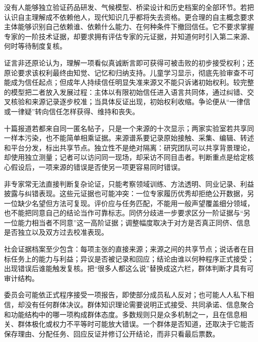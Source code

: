 没有人能够独立验证药品研发、气候模型、桥梁设计和历史档案的全部环节。若把认识自主理解成不依赖他人，现代知识几乎都将失去资格。更合理的自主概念要求主体能够识别自己依赖谁、依赖什么能力、在何种条件下撤回信任。它不要求掌握专家的一阶技术证据，却要求拥有评估专家的元证据，并知道何时引入第二来源、何时等待制度复核。

证言非还原论认为，理解一项看似真诚断言即可获得可被击败的初步接受权利；还原论要求该权利最终由知觉、记忆和归纳支持。儿童学习显示，彻底先验审查不可能成为信任起点；但成年人持续信任明显失准来源又不能只诉诸初始权利。较完整的模型把二者放入发展过程：主体以有限初始信任进入语言共同体，通过纠错、交叉核验和来源记录逐步校准；当具体反证出现，初始权利收缩。争论便从“一律信或一律疑”转向信任怎样获得、维持和丧失。

十篇报道若都来自同一匿名帖子，只是一个来源的十次显示；两家实验室若共享同一样本污染，也不能简单相乘证据。来源谱系要记录原始接触、采集、编辑、转述和平台分发，标出共享节点。独立性不是绝对隔离：研究团队可以共享背景理论，却使用独立测量；记者可以访问同一现场，却采访不同目击者。判断重点是给定核心假设后，一项来源的错误是否使另一项更容易同时错误。

非专家常无法直接判断复杂论证，只能考察领域训练、方法透明、同业记录、利益披露与纠错表现。这些元证据也可能冲突：一位专家履历优秀却拒绝公开数据，另一位缺少名望但方法可复现。评价应与任务匹配，不能用一般声望覆盖细分领域，也不能把同意自己的结论当作可靠标志。同侪分歧进一步要求区分一阶证据与“另一位能力相当者不同意”这一高阶证据；调整幅度取决于对方是否真正同侪、信息是否独立以及双方过去校准表现。

\begin{argumentbox}
社会证据档案至少包含：每项主张的直接来源；来源之间的共享节点；说话者在目标任务上的能力与利益；异议是否被记录和回应；结论由谁以何种程序正式接受；出现错误后谁能触发复核。把“很多人都这么说”替换成这六栏，群体判断才具有可审计结构。
\end{argumentbox}

委员会可能依正式程序接受一项报告，即使部分成员私人反对；也可能人人私下相信，却没有任何群体决议。群体知识理论需要说明正式接受、共同承诺、信息聚合和功能结构中的哪一项构成群体态度。多数规则只是众多机制之一，且在信息相关、群体极化或权力不平等时可能放大错误。一个群体是否知道，还取决于它能否保存理由、分配任务、回应反证并修订公开结论，而非只看最后票数。

